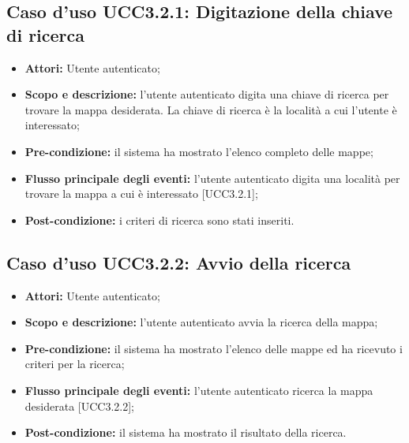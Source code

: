 \subsection{Caso d'uso UCC3.2.1: Digitazione della chiave di ricerca}

\begin{itemize}
\item \textbf{Attori:} Utente autenticato;
\item \textbf{Scopo e descrizione:} l'utente autenticato digita una chiave di ricerca per trovare la mappa desiderata. La chiave di ricerca è la località a cui l'utente è interessato;
\item \textbf{Pre-condizione:} il sistema ha mostrato l'elenco completo delle mappe;
\item \textbf{Flusso principale degli eventi:} l'utente autenticato digita una località per trovare la mappa a cui è interessato [UCC3.2.1]; 
\item \textbf{Post-condizione:} i criteri di ricerca sono stati inseriti.
\end{itemize}

\subsection{Caso d'uso UCC3.2.2: Avvio della ricerca}

\begin{itemize}
\item \textbf{Attori:} Utente autenticato;
\item \textbf{Scopo e descrizione:} l'utente autenticato avvia la ricerca della mappa;
\item \textbf{Pre-condizione:} il sistema ha mostrato l'elenco delle mappe ed ha ricevuto i criteri per la ricerca;
\item \textbf{Flusso principale degli eventi:} l'utente autenticato ricerca la mappa desiderata [UCC3.2.2];
\item \textbf{Post-condizione:} il sistema ha mostrato il risultato della ricerca.
\end{itemize}

